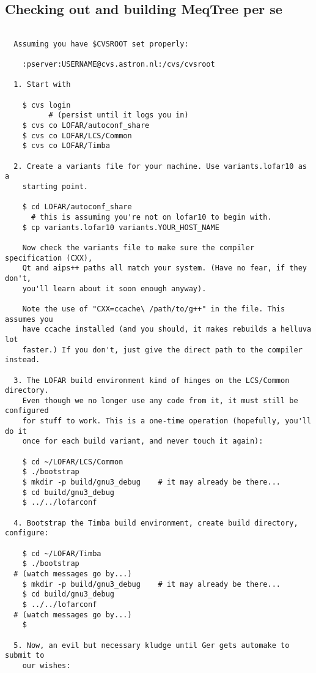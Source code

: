 \documentclass[10pt]{article}
\begin{document}
\subsection{Checking out and building MeqTree per se}
  
\begin{verbatim}

  Assuming you have $CVSROOT set properly:

    :pserver:USERNAME@cvs.astron.nl:/cvs/cvsroot

  1. Start with 

    $ cvs login 
          # (persist until it logs you in)
    $ cvs co LOFAR/autoconf_share
    $ cvs co LOFAR/LCS/Common
    $ cvs co LOFAR/Timba

  2. Create a variants file for your machine. Use variants.lofar10 as a 
    starting point.

    $ cd LOFAR/autoconf_share
      # this is assuming you're not on lofar10 to begin with.
    $ cp variants.lofar10 variants.YOUR_HOST_NAME

    Now check the variants file to make sure the compiler specification (CXX),
    Qt and aips++ paths all match your system. (Have no fear, if they don't, 
    you'll learn about it soon enough anyway).

    Note the use of "CXX=ccache\ /path/to/g++" in the file. This assumes you
    have ccache installed (and you should, it makes rebuilds a helluva lot 
    faster.) If you don't, just give the direct path to the compiler instead.
    
  3. The LOFAR build environment kind of hinges on the LCS/Common directory.
    Even though we no longer use any code from it, it must still be configured
    for stuff to work. This is a one-time operation (hopefully, you'll do it
    once for each build variant, and never touch it again):

    $ cd ~/LOFAR/LCS/Common
    $ ./bootstrap
    $ mkdir -p build/gnu3_debug    # it may already be there...
    $ cd build/gnu3_debug
    $ ../../lofarconf

  4. Bootstrap the Timba build environment, create build directory, configure:

    $ cd ~/LOFAR/Timba
    $ ./bootstrap
  # (watch messages go by...)
    $ mkdir -p build/gnu3_debug    # it may already be there...
    $ cd build/gnu3_debug
    $ ../../lofarconf
  # (watch messages go by...)
    $

  5. Now, an evil but necessary kludge until Ger gets automake to submit to 
    our wishes:


\end{verbatim}
\end{document}
